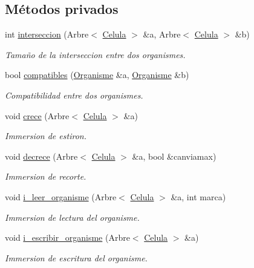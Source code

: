 \subsection*{Métodos privados}
\begin{DoxyCompactItemize}
\item 
int \hyperlink{class_organisme_a00b103256f3fb0b95a074a9b06de14ac}{interseccion} (Arbre$<$ \hyperlink{class_celula}{Celula} $>$ \&a, Arbre$<$ \hyperlink{class_celula}{Celula} $>$ \&b)
\begin{DoxyCompactList}\small\item\em Tamaño de la interseccion entre dos organismes. \end{DoxyCompactList}\item 
bool \hyperlink{class_organisme_a054a7723a2083af4c182b8f0266ec54c}{compatibles} (\hyperlink{class_organisme}{Organisme} \&a, \hyperlink{class_organisme}{Organisme} \&b)
\begin{DoxyCompactList}\small\item\em Compatibilidad entre dos organismes. \end{DoxyCompactList}\item 
void \hyperlink{class_organisme_ab90a2daa639560e569d8de05297b47b6}{crece} (Arbre$<$ \hyperlink{class_celula}{Celula} $>$ \&a)
\begin{DoxyCompactList}\small\item\em Immersion de estiron. \end{DoxyCompactList}\item 
void \hyperlink{class_organisme_a7a0d6dc7f9de023d5dc33bd024a4b161}{decrece} (Arbre$<$ \hyperlink{class_celula}{Celula} $>$ \&a, bool \&canviamax)
\begin{DoxyCompactList}\small\item\em Immersion de recorte. \end{DoxyCompactList}\item 
void \hyperlink{class_organisme_a75f7f37f4c89327fcc3376ea98ccc97c}{i\-\_\-leer\-\_\-organisme} (Arbre$<$ \hyperlink{class_celula}{Celula} $>$ \&a, int marca)
\begin{DoxyCompactList}\small\item\em Immersion de lectura del organisme. \end{DoxyCompactList}\item 
void \hyperlink{class_organisme_ac88ecbfd1eafc62ba3744ed104626ab5}{i\-\_\-escribir\-\_\-organisme} (Arbre$<$ \hyperlink{class_celula}{Celula} $>$ \&a)
\begin{DoxyCompactList}\small\item\em Immersion de escritura del organisme. \end{DoxyCompactList}\item 

\end{DoxyCompactItemize}
